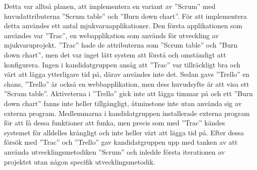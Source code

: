 \newline
\newline
Detta var alltså planen, att implementera en variant av ''Scrum'' med huvudattributerna ''Scrum table'' och ''Burn down chart''. För att implementera detta användes ett antal mjukvaruapplikationer. Den första applikationen som användes var ''Trac'', en webapplikation som används för utveckling av mjukvaruprojekt. ''Trac'' hade de attributerna som ''Scrum table'' och ''Burn down chart'', men det var  inget lätt system att förstå och omständigt att konfigurera. Ingen i kandidatgruppen ansåg att ''Trac'' var tillräckligt bra och värt att lägga ytterligare tid på, därav användes inte det. Sedan gavs ''Trello'' en chans, ''Trello'' är också en webbapplikation, men dess huvudsyfte är att visa ett ''Scrum table''. Aktiveterna i ''Trello'' gick inte att lägga timmar på och ett ''Burn down chart'' fanns inte heller tillgängligt, åtminstone inte utan använda sig av externa program. Medlemmarna i kandidatgruppen installerade externa program för att få dessa funktioner att funka, men precis som med ''Trac'' kändes systemet för alldelles krångligt och inte heller värt att lägga tid på.
\newline
\newline
Efter dessa försök med ''Trac'' och ''Trello'' gav kandidatgruppen upp med tanken av att använda utvecklingsmetodiken ''Scrum'' och inledde första iterationen av projektet utan någon specifik utvecklingsmetodik.

